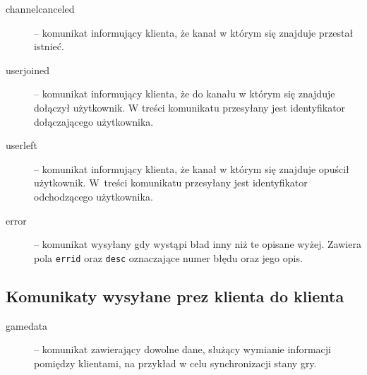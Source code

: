 \documentclass[a4paper, 10pt]{article}
\begin{document}
\begin{description}
 \item[channelcanceled] -- komunikat informujący klienta, że kanał w którym się znajduje przestał istnieć.
  \item[userjoined] -- komunikat informujący klienta, że do kanału w którym się znajduje dołączył użytkownik. W treści komunikatu przesyłany jest identyfikator dołączającego użytkownika.
 \item[userleft] -- komunikat informujący klienta, że kanał w którym się znajduje opuścił użytkownik. W~treści komunikatu przesyłany jest identyfikator odchodzącego użytkownika.
 \item[error] -- komunikat wysyłany gdy wystąpi bład inny niż te opisane wyżej. Zawiera pola \texttt{errid} oraz \texttt{desc} oznaczające numer błędu oraz jego opis.
\end{description}

\subsection{Komunikaty wysyłane prez klienta do klienta}
\begin{description}
\item[gamedata]  -- komunikat zawierający dowolne dane, służący wymianie informacji pomiędzy klientami, na przykład w celu synchronizacji stany gry.
\end{description}
\end{document}
